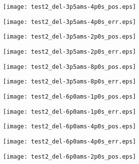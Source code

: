 \begin{figure}
    \centering
    \texttt{[image: test2\_del-3p5ams-4p0s\_pos.eps]}
\end{figure}
\begin{figure}
    \centering
    \texttt{[image: test2\_del-3p5ams-4p0s\_err.eps]}
\end{figure}
\begin{figure}
    \centering
    \texttt{[image: test2\_del-3p5ams-2p0s\_pos.eps]}
\end{figure}
\begin{figure}
    \centering
    \texttt{[image: test2\_del-3p5ams-2p0s\_err.eps]}
\end{figure}
\begin{figure}
    \centering
    \texttt{[image: test2\_del-3p5ams-8p0s\_pos.eps]}
\end{figure}
\begin{figure}
    \centering
    \texttt{[image: test2\_del-3p5ams-8p0s\_err.eps]}
\end{figure}
\begin{figure}
    \centering
    \texttt{[image: test2\_del-6p0ams-1p0s\_pos.eps]}
\end{figure}
\begin{figure}
    \centering
    \texttt{[image: test2\_del-6p0ams-1p0s\_err.eps]}
\end{figure}
\begin{figure}
    \centering
    \texttt{[image: test2\_del-6p0ams-4p0s\_pos.eps]}
\end{figure}
\begin{figure}
    \centering
    \texttt{[image: test2\_del-6p0ams-4p0s\_err.eps]}
\end{figure}
\clearpage
\begin{figure}
    \centering
    \texttt{[image: test2\_del-6p0ams-2p0s\_pos.eps]}
\end{figure}

